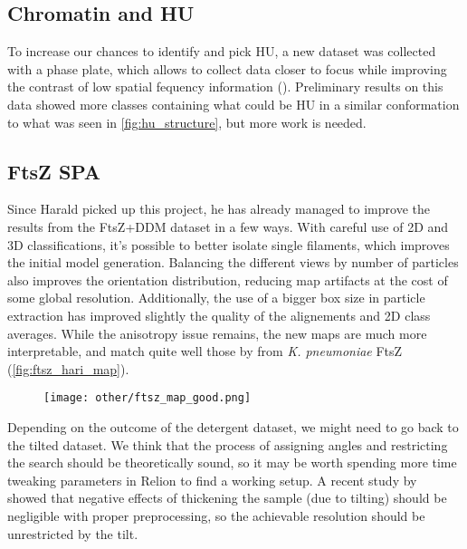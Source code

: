 \subsection{Chromatin and HU}\label{future_hu}

To increase our chances to identify and pick HU, a new dataset was collected with a phase plate, which allows to collect data closer to focus while improving the contrast of low spatial fequency information ().
Preliminary results on this data showed more classes containing what could be HU in a similar conformation to what was seen in \autoref{fig:hu_structure}, but more work is needed.


\subsection{FtsZ SPA}\label{future_ftsz_spa}

Since Harald picked up this project, he has already managed to improve the results from the FtsZ+DDM dataset in a few ways.
With careful use of 2D and 3D classifications, it's possible to better isolate single filaments, which improves the initial model generation.
Balancing the different views by number of particles also improves the orientation distribution, reducing map artifacts at the cost of some global resolution.
Additionally, the use of a bigger box size in particle extraction has improved slightly the quality of the alignements and 2D class averages.
While the anisotropy issue remains, the new maps are much more interpretable, and match quite well those by \citet{fujitaStructuresFtsZSingle2023} from \textit{K. pneumoniae} FtsZ (\autoref{fig:ftsz_hari_map}).

\begin{figure}[ht]
    \centering
    \texttt{[image: other/ftsz\_map\_good.png]}
    \label{fig:ftsz_hari_map}
\end{figure}

Depending on the outcome of the detergent dataset, we might need to go back to the tilted dataset.
We think that the process of assigning angles and restricting the search should be theoretically sound, so it may be worth spending more time tweaking parameters in Relion to find a working setup.
A recent study by ~\citet{aiyerOvercomingResolutionAttenuation2024} showed that negative effects of thickening the sample (due to tilting) should be negligible with proper preprocessing, so the achievable resolution should be unrestricted by the tilt.

